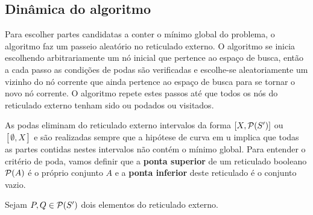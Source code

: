 \subsection{Dinâmica do algoritmo}
Para escolher partes candidatas a conter o mínimo global do problema,
o algoritmo  faz um passeio aleatório no reticulado 
externo. O algoritmo se inicia escolhendo arbitrariamente um nó inicial 
que pertence ao espaço de busca, então a cada passo as condições de podas
são verificadas e escolhe-se aleatoriamente um vizinho do nó corrente
que ainda pertence ao espaço de busca para se tornar o novo nó corrente.
O algoritmo repete estes passos até que todos os nós do reticulado 
externo tenham sido ou podados ou visitados.

As podas eliminam do reticulado externo intervalos da forma 
$[X, \mathcal{P}(S')]$ ou $[\emptyset, X]$ e são realizadas sempre que a 
hipótese de curva em u implica que todas as partes contidas nestes 
intervalos não contém o mínimo global. Para entender o critério de poda,
vamos definir que a {\bf ponta superior} de um reticulado booleano 
$\mathcal{P} (A)$ é o próprio conjunto $A$ e a {\bf ponta inferior} deste
reticulado é o conjunto vazio.

\begin{mydefinition}
Sejam $P, Q \in \mathcal{P} (S')$ dois elementos do reticulado externo.
\end{mydefinition}
